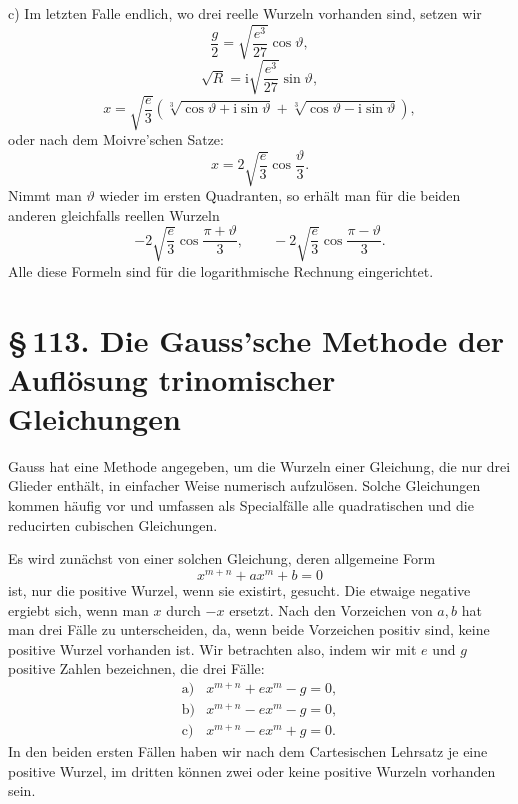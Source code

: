 \documentclass[11pt]{article}
\providecommand{\ii}{\mathrm{i}}
\providecommand{\sect}[2]{\section*{\S\,#1. #2}}
\begin{document}
c) Im letzten Falle endlich, wo drei reelle Wurzeln vorhanden sind, setzen wir
\begin{equation}
        \frac g2=\sqrt{\frac{e^3}{27}}\cos\vartheta,
\tag{10}
\end{equation}
\[
        \sqrt R=\ii\sqrt{\frac{e^3}{27}}\sin\vartheta,
\]
\[
        x=\sqrt{\frac e3}\left(
        \sqrt[3]{\cos\vartheta+\ii\sin\vartheta}
        +\sqrt[3]{\cos\vartheta-\ii\sin\vartheta}\right),
\]
oder nach dem Moivre'schen Satze:
\begin{equation}
        x=2\sqrt{\frac e3}\cos\frac{\vartheta}{3}.
\tag{11}
\end{equation}
Nimmt man $\vartheta$ wieder im ersten Quadranten, so erhält man für die beiden anderen gleichfalls reellen Wurzeln
\[
        -2\sqrt{\frac e3}\cos\frac{\pi+\vartheta}{3},
        \qquad
        -2\sqrt{\frac e3}\cos\frac{\pi-\vartheta}{3}.
\]
Alle diese Formeln sind für die logarithmische Rechnung eingerichtet.

\sect{113}{Die Gauss'sche Methode der Auflösung trinomischer Gleichungen}

Gauss hat eine Methode angegeben, um die Wurzeln einer Gleichung, die nur drei Glieder enthält, in einfacher Weise numerisch aufzulösen. Solche Gleichungen kommen häufig vor und umfassen als Specialfälle alle quadratischen und die reducirten cubischen Gleichungen.

Es wird zunächst von einer solchen Gleichung, deren allgemeine Form
\begin{equation}
        x^{m+n}+ax^m+b=0
\tag{1}
\end{equation}
ist, nur die positive Wurzel, wenn sie existirt, gesucht. Die etwaige negative ergiebt sich, wenn man $x$ durch $-x$ ersetzt. Nach den Vorzeichen von $a,b$ hat man drei Fälle zu unterscheiden, da, wenn beide Vorzeichen positiv sind, keine positive Wurzel vorhanden ist. Wir betrachten also, indem wir mit $e$ und $g$ positive Zahlen bezeichnen, die drei Fälle:
\[
\begin{array}{ll}
\mathrm{a)}&x^{m+n}+ex^m-g=0,\\
\mathrm{b)}&x^{m+n}-ex^m-g=0,\\
\mathrm{c)}&x^{m+n}-ex^m+g=0.
\end{array}
\]
In den beiden ersten Fällen haben wir nach dem Cartesischen Lehrsatz je eine positive Wurzel, im dritten können zwei oder keine positive Wurzeln vorhanden sein.
\end{document}
